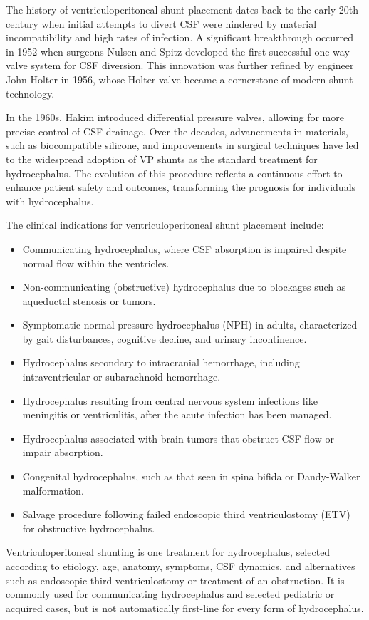 The history of ventriculoperitoneal shunt placement dates back to the early 20th century when initial attempts to divert CSF were hindered by material incompatibility and high rates of infection. A significant breakthrough occurred in 1952 when surgeons Nulsen and Spitz developed the first successful one-way valve system for CSF diversion. This innovation was further refined by engineer John Holter in 1956, whose Holter valve became a cornerstone of modern shunt technology.

In the 1960s, Hakim introduced differential pressure valves, allowing for more precise control of CSF drainage. Over the decades, advancements in materials, such as biocompatible silicone, and improvements in surgical techniques have led to the widespread adoption of VP shunts as the standard treatment for hydrocephalus. The evolution of this procedure reflects a continuous effort to enhance patient safety and outcomes, transforming the prognosis for individuals with hydrocephalus.

The clinical indications for ventriculoperitoneal shunt placement include:

\begin{itemize}
  \item Communicating hydrocephalus, where CSF absorption is impaired despite normal flow within the ventricles.
  \item Non-communicating (obstructive) hydrocephalus due to blockages such as aqueductal stenosis or tumors.
  \item Symptomatic normal-pressure hydrocephalus (NPH) in adults, characterized by gait disturbances, cognitive decline, and urinary incontinence.
  \item Hydrocephalus secondary to intracranial hemorrhage, including intraventricular or subarachnoid hemorrhage.
  \item Hydrocephalus resulting from central nervous system infections like meningitis or ventriculitis, after the acute infection has been managed.
  \item Hydrocephalus associated with brain tumors that obstruct CSF flow or impair absorption.
  \item Congenital hydrocephalus, such as that seen in spina bifida or Dandy-Walker malformation.
  \item Salvage procedure following failed endoscopic third ventriculostomy (ETV) for obstructive hydrocephalus.
\end{itemize}

Ventriculoperitoneal shunting is one treatment for hydrocephalus, selected according to etiology, age, anatomy, symptoms, CSF dynamics, and alternatives such as endoscopic third ventriculostomy or treatment of an obstruction. It is commonly used for communicating hydrocephalus and selected pediatric or acquired cases, but is not automatically first-line for every form of hydrocephalus.

